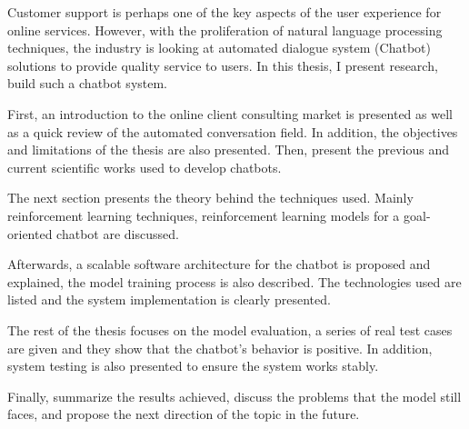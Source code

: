 \documentclass[12pt,a4paper,oneside]{book} %
\begin{document}
\begin{abstractTA}

Customer support is perhaps one of the key aspects of the user experience for online services. However, with the proliferation of natural language processing techniques, the industry is looking at automated dialogue system (Chatbot) solutions to provide quality service to users. In this thesis, I present research, build such a chatbot system.

First, an introduction to the online client consulting market is presented as well as a quick review of the automated conversation field. In addition, the objectives and limitations of the thesis are also presented. Then, present the previous and current scientific works used to develop chatbots.

The next section presents the theory behind the techniques used. Mainly reinforcement learning techniques, reinforcement learning models for a goal-oriented chatbot are discussed.

Afterwards, a scalable software architecture for the chatbot is proposed and explained, the model training process is also described. The technologies used are listed and the system implementation is clearly presented.

The rest of the thesis focuses on the model evaluation, a series of real test cases are given and they show that the chatbot's behavior is positive. In addition, system testing is also presented to ensure the system works stably.

Finally, summarize the results achieved, discuss the problems that the model still faces, and propose the next direction of the topic in the future.

\end{abstractTA}
\end{document}
